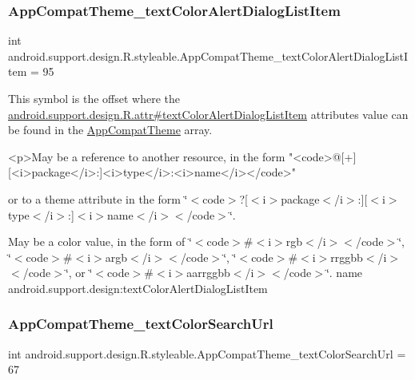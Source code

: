 \subsubsection{\texorpdfstring{App\+Compat\+Theme\+\_\+text\+Color\+Alert\+Dialog\+List\+Item}{AppCompatTheme\_textColorAlertDialogListItem}}
{\footnotesize\ttfamily int android.\+support.\+design.\+R.\+styleable.\+App\+Compat\+Theme\+\_\+text\+Color\+Alert\+Dialog\+List\+Item = 95\hspace{0.3cm}{\ttfamily [static]}}

This symbol is the offset where the \hyperlink{classandroid_1_1support_1_1design_1_1R_1_1attr_adfa6d58ea9caa8987856e8baa586f3d4}{android.\+support.\+design.\+R.\+attr\#text\+Color\+Alert\+Dialog\+List\+Item} attribute\textquotesingle{}s value can be found in the \hyperlink{classandroid_1_1support_1_1design_1_1R_1_1styleable_afb351dc8de20cbd4c89abe360373010c}{App\+Compat\+Theme} array.

\begin{DoxyVerb}      <p>May be a reference to another resource, in the form "<code>@[+][<i>package</i>:]<i>type</i>:<i>name</i></code>"
\end{DoxyVerb}
 or to a theme attribute in the form \char`\"{}$<$code$>$?\mbox{[}$<$i$>$package$<$/i$>$\+:\mbox{]}\mbox{[}$<$i$>$type$<$/i$>$\+:\mbox{]}$<$i$>$name$<$/i$>$$<$/code$>$\char`\"{}. 

May be a color value, in the form of \char`\"{}$<$code$>$\#$<$i$>$rgb$<$/i$>$$<$/code$>$\char`\"{}, \char`\"{}$<$code$>$\#$<$i$>$argb$<$/i$>$$<$/code$>$\char`\"{}, \char`\"{}$<$code$>$\#$<$i$>$rrggbb$<$/i$>$$<$/code$>$\char`\"{}, or \char`\"{}$<$code$>$\#$<$i$>$aarrggbb$<$/i$>$$<$/code$>$\char`\"{}.  name android.\+support.\+design\+:text\+Color\+Alert\+Dialog\+List\+Item \mbox{\label{classandroid_1_1support_1_1design_1_1R_1_1styleable_aafa1ab7dc0cc5540f3c561bc2dcdb146}} 
\subsubsection{\texorpdfstring{App\+Compat\+Theme\+\_\+text\+Color\+Search\+Url}{AppCompatTheme\_textColorSearchUrl}}
{\footnotesize\ttfamily int android.\+support.\+design.\+R.\+styleable.\+App\+Compat\+Theme\+\_\+text\+Color\+Search\+Url = 67\hspace{0.3cm}{\ttfamily [static]}}

